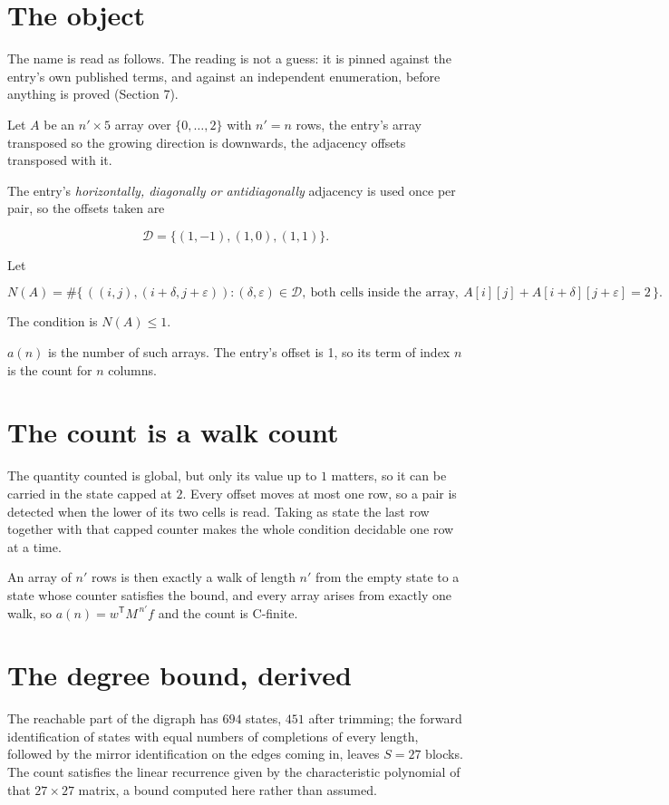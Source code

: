 \documentclass[11pt]{article}
\theoremstyle{definition}
\begin{document}
\section{The object}

The name is read as follows. The reading is not a guess: it is pinned against the entry's own published terms, and against an independent enumeration, before anything is proved (Section 7).

Let $A$ be an $n' \times 5$ array over $\{0,\dots,2\}$ with $n' = n$ rows, the entry's array transposed so the growing direction is downwards, the adjacency offsets transposed with it.

The entry's {\itshape horizontally, diagonally or antidiagonally} adjacency is used once per pair, so the offsets taken are

\[\mathcal{D} = \{(1,-1), (1,0), (1,1)\}.\]

Let

\[N(A) = \#\bigl\{\,((i,j),(i{+}\delta,j{+}\varepsilon)) : (\delta,\varepsilon) \in \mathcal{D},\ \text{both cells inside the array},\ A[i][j] + A[i{+}\delta][j{+}\varepsilon] = 2\,\bigr\}.\]

The condition is $N(A) \le 1$.

$a(n)$ is the number of such arrays. The entry's offset is 1, so its term of index $n$ is the count for $n$ columns.

\section{The count is a walk count}

The quantity counted is global, but only its value up to $1$ matters, so it can be carried in the state capped at $2$. Every offset moves at most one row, so a pair is detected when the lower of its two cells is read. Taking as state the last row together with that capped counter makes the whole condition decidable one row at a time.

An array of $n'$ rows is then exactly a walk of length $n'$ from the empty state to a state whose counter satisfies the bound, and every array arises from exactly one walk, so $a(n) = w^{\mathsf T}M^{\,n'}f$ and the count is C-finite.

\section{The degree bound, derived}

The reachable part of the digraph has $694$ states, $451$ after trimming; the forward identification of states with equal numbers of completions of every length, followed by the mirror identification on the edges coming in, leaves $S = 27$ blocks. The count satisfies the linear recurrence given by the characteristic polynomial of that $27\times27$ matrix, a bound computed here rather than assumed.
\end{document}
